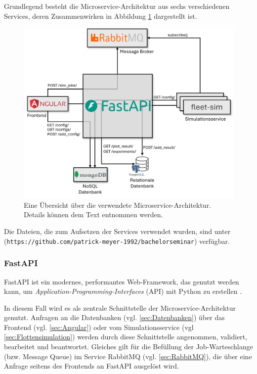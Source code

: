 \documentclass[11pt,a4paper]{article}
\begin{document}
Grundlegend besteht die Microservice-Architektur aus sechs verschiedenen Services, deren Zusammenwirken
in Abbildung \ref{fig:microservice-architektur} dargestellt ist.

\begin{figure}
	\label{fig:microservice-architektur}
	\centering
	\includegraphics[width=\textwidth]{media/Microservice-Architektur.png}
	\caption{
		Eine Übersicht über die verwendete Microservice-Architektur.
		Details können dem Text entnommen werden.
	}
\end{figure}

Die Dateien, die zum Aufsetzen der Services verwendet wurden, sind unter
(\lstinline|https://github.com/patrick-meyer-1992/bachelorseminar|) \cite{Meyer_bachelorseminar}
verfügbar.

\subsubsection{FastAPI}
\label{sec:FastAPI}
FastAPI ist ein modernes, performantes Web-Framework, das genutzt werden kann, um \emph{Application-Programming-Interfaces} (API)
mit Python zu erstellen \cite{Ramirez_FastAPI}.

In diesem Fall wird es als zentrale Schnittstelle der Microservice-Architektur genutzt.
Anfragen an die Datenbanken (vgl. \ref{sec:Datenbanken})
über das Frontend (vgl. \ref{sec:Angular}) oder vom Simulationsservice (vgl \ref{sec:Flottensimulation})
werden durch diese Schnittstelle angenommen, validiert, bearbeitet und beantwortet.
Gleiches gilt für die Befüllung der Job-Warteschlange (bzw. Message Queue) im Service
RabbitMQ (vgl. \ref{sec:RabbitMQ}), die über eine Anfrage seitens des Frontends an
FastAPI ausgelöst wird.
\end{document}
